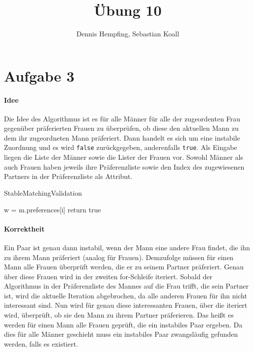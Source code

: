 \documentclass[12pt]{scrartcl}%
\theoremstyle{nonumberplain}
\newcommand{\code}[1]{\lstinline[basicstyle=\ttfamily\color{black}]{#1}}
\begin{document}
\author{Dennis Hempfing, Sebastian Koall}
\title{Übung 10}
\date{} 
\pagestyle{myheadings}

\maketitle %

\section*{Aufgabe 3}

\paragraph{Idee} Die Idee des Algorithmus ist es für alle Männer für alle der zugeordenten Frau gegenüber präferierten Frauen zu überprüfen, ob diese den aktuellen Mann zu dem ihr zugeordneten Mann präferiert. Dann handelt es sich um eine instabile Zuordnung und es wird \code{false} zurückgegeben, anderenfalls \code{true}. Als Eingabe liegen die Liste der Männer sowie die Lister der Frauen vor. Sowohl Männer als auch Frauen haben jeweils ihre Präferenzliste sowie den Index des zugewiesenen Partners in der Präferenzliste als Attribut.

\begin{algorithm}[ht!]
	\caption{StableMatchingValidation}
	
	
	 {
		 {
			w = m.preferences[i]\;
		}
	}
	return true\;	
\end{algorithm}

\paragraph{Korrektheit} Ein Paar ist genau dann instabil, wenn der Mann eine andere Frau findet, die ihn zu ihrem Mann präferiert (analog für Frauen). Demzufolge müssen für einen Mann alle Frauen überprüft werden, die er zu seinem Partner präferiert. Genau über diese Frauen wird in der zweiten for-Schleife iteriert. Sobald der Algorithmus in der Präferenzliste des Mannes auf die Frau trifft, die sein Partner ist, wird die aktuelle Iteration abgebrochen, da alle anderen Frauen für ihn nicht interessant sind. Nun wird für genau diese interessanten Frauen, über die iteriert wird, überprüft, ob sie den Mann zu ihrem Partner präferieren. Das heißt es werden für einen Mann alle Frauen geprüft, die ein instabiles Paar ergeben. Da dies für alle Männer geschieht muss ein instabiles Paar zwangsläufig gefunden werden, falls es existiert.
\end{document}
